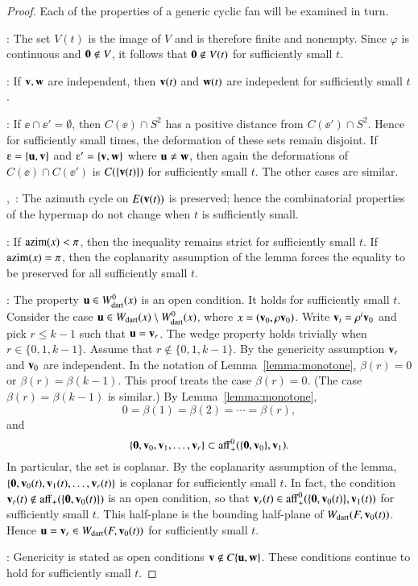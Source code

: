 \begin{proof} Each of the properties of a generic cyclic fan will be examined in turn.

:  The set $V(t)$ is the image of $V$ and is therefore finite and nonempty.   Since $\varphi$ is continuous and ${\mathbf 0}\not\in V$, it follows that ${\mathbf 0}\not\in V(t)$ for sufficiently small $t$.

: If ${\mathbf v},{\mathbf w}$ are independent, then ${\mathbf v}(t)$ and ${\mathbf w}(t)$ are indepedent for sufficiently small $t$.

: If $\ee \cap \ee'=\emptyset$, then $C(\ee)\cap S^2$ has a positive distance from $C(\ee')\cap S^2$.  Hence for sufficiently small times, the deformation of these sets remain disjoint.
If $\ee=\{\u,\v\}$ and $\ee'=\{\v,\w\}$ where ${\mathbf u}\ne{\mathbf w}$, then again the deformations of $C(\ee)\cap C(\ee')$ is $C(\{{\mathbf v}(t)\})$ for sufficiently small $t$.  The other cases are similar.

,~:  The azimuth cycle on $E({\mathbf v}(t))$ is preserved; hence the combinatorial properties of the hypermap do not change when $t$ is sufficiently small.

: If ${\operatorname{azim}}(x)<\pi$, then the inequality remains strict for sufficiently small $t$.  If ${\operatorname{azim}}(x)=\pi$, then the coplanarity assumption of the lemma forces the equality to be preserved for all sufficiently small $t$.

: The property ${\mathbf u}\in W^0_{\text{dart}}(x)$ is an open condition.  It holds for sufficiently small $t$. Consider the case ${\mathbf u}\in W_{\text{dart}}(x)\setminus W^0_{\text{dart}}(x)$, where $x=  ({\mathbf v}_0,\rho{\mathbf v}_0)$.   Write ${\mathbf v}_i = \rho^i{\mathbf v}_0$ and pick $r\le k-1$ such that ${\mathbf u} = {\mathbf v}_r$.  The wedge property holds trivially when $r\in\{0,1,k-1\}$. Assume that $r\not\in\{0,1,k-1\}$. 
By the genericity assumption ${\mathbf v}_r$ and ${\mathbf v}_0$ are independent.  In the notation of Lemma~\ref{lemma:monotone},
$\beta(r) = 0$ or $\beta(r) = \beta(k-1)$.  This proof treats the case $\beta(r)=0$. (The case $\beta(r)=\beta(k-1)$ is similar.)   By Lemma~\ref{lemma:monotone}, 
$$0=\beta(1)=\beta(2)=\cdots=\beta(r),$$
and 
$$
\{{\mathbf 0},{\mathbf v}_0,{\mathbf v}_1,\ldots,{\mathbf v}_r\} \subset {\operatorname{aff}}^0_+(\{{\mathbf 0},{\mathbf v}_0\},{\mathbf v}_1).
$$
In particular, the set is coplanar.   By the coplanarity assumption of the lemma,  $\{{\mathbf 0},{\mathbf v}_0(t),{\mathbf v}_1(t),\ldots,{\mathbf v}_r(t)\}$ is coplanar for
sufficiently small $t$.  In fact, the condition ${\mathbf v}_r(t)\not\in {\operatorname{aff}}_+(\{{\mathbf 0},{\mathbf v}_0(t)\})$ is an open condition, so that ${\mathbf v}_r(t)\in {\operatorname{aff}}^0_+(\{{\mathbf 0},{\mathbf v}_0(t)\},{\mathbf v}_1(t))$ for sufficiently small $t$.  This half-plane is the bounding half-plane of $W_{\text{dart}}(F,{\mathbf v}_0(t))$.  Hence ${\mathbf u} = {\mathbf v}_r\in W_{\text{dart}}(F,{\mathbf v}_0(t))$ for sufficiently small $t$.

: Genericity is stated as open conditions ${\mathbf v}\not\in C\{{\mathbf u},{\mathbf w}\}$.  These conditions continue to hold for sufficiently small $t$.
\end{proof}


